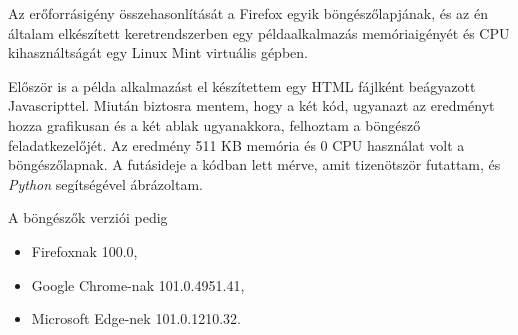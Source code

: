 


Az erőforrásigény összehasonlítását a Firefox egyik böngészőlapjának, és az én általam elkészített keretrendszerben egy példaalkalmazás memóriaigényét és CPU kihasználtságát egy Linux Mint virtuális gépben.


Először is a példa alkalmazást el készítettem egy HTML fájlként beágyazott Javascripttel. Miután biztosra mentem, hogy a két kód, ugyanazt az eredményt hozza grafikusan és a két ablak ugyanakkora, felhoztam a böngésző feladatkezelőjét. Az eredmény 511 KB memória és 0 CPU használat volt a böngészőlapnak. A futásideje a kódban lett mérve, amit tizenötször futattam, és \textit{Python} segítségével ábrázoltam.

A böngészők verziói pedig
\begin{itemize}
    \item Firefoxnak 100.0,
    \item Google Chrome-nak 101.0.4951.41,
    \item Microsoft Edge-nek 101.0.1210.32.
\end{itemize}

